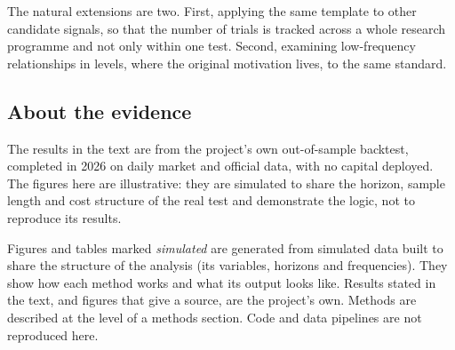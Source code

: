 \documentclass[
  british,
  a4paper,
]{article}
\begin{document}
The natural extensions are two. First, applying the same template to
other candidate signals, so that the number of trials is tracked across
a whole research programme and not only within one test. Second,
examining low-frequency relationships in levels, where the original
motivation lives, to the same standard.

\subsection{About the evidence}\label{about-the-evidence}

The results in the text are from the project's own out-of-sample
backtest, completed in 2026 on daily market and official data, with no
capital deployed. The figures here are illustrative: they are simulated
to share the horizon, sample length and cost structure of the real test
and demonstrate the logic, not to reproduce its results.

Figures and tables marked \emph{simulated} are generated from simulated
data built to share the structure of the analysis (its variables,
horizons and frequencies). They show how each method works and what its
output looks like. Results stated in the text, and figures that give a
source, are the project's own. Methods are described at the level of a
methods section. Code and data pipelines are not reproduced here.
\end{document}
